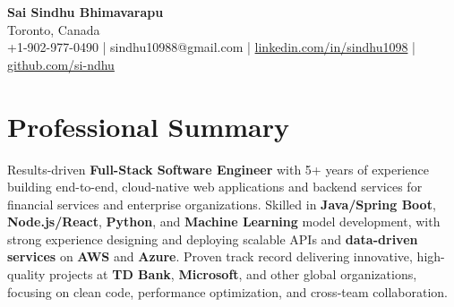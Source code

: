 \documentclass[letterpaper,11pt]{article}
\begin{document}
\begin{center}
  {\Large \textbf{Sai Sindhu Bhimavarapu}} \\
  Toronto, Canada \\
  +1-902-977-0490 \enspace | \enspace sindhu10988@gmail.com \enspace | \enspace \href{https://www.linkedin.com/in/sindhu1098/}{linkedin.com/in/sindhu1098} \enspace | \enspace \href{https://github.com/si-ndhu}{github.com/si-ndhu}
\end{center}

\section{Professional Summary}
  \begin{itemize}[leftmargin=0.15in, label={}]
    \small{\item{
     Results-driven \textbf{Full-Stack Software Engineer} with 5+ years of experience building end-to-end, cloud-native web applications and backend services for financial services and enterprise organizations. Skilled in \textbf{Java/Spring Boot}, \textbf{Node.js/React}, \textbf{Python}, and \textbf{Machine Learning} model development, with strong experience designing and deploying scalable APIs and \textbf{data-driven services} on \textbf{AWS} and \textbf{Azure}. Proven track record delivering innovative, high-quality projects at \textbf{TD Bank}, \textbf{Microsoft}, and other global organizations, focusing on clean code, performance optimization, and cross-team collaboration.
    }}
  \end{itemize}
\vspace{-16pt}

\end{document}
